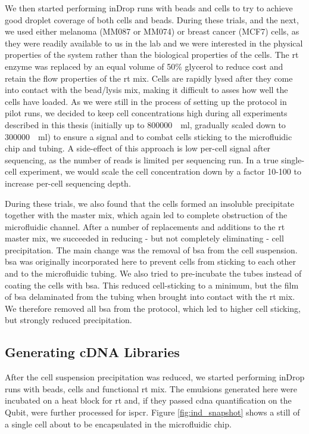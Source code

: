 We then started performing inDrop runs with beads and cells to try to achieve good droplet coverage of both cells and beads. During these trials, and the next, we used either melanoma (MM087 or MM074) or breast cancer (MCF7) cells, as they were readily available to us in the lab and we were interested in the physical properties of the system rather than the biological properties of the cells. The \acrshort{rt} enzyme was replaced by an equal volume of 50\% glycerol to reduce cost and retain the flow properties of the \acrshort{rt} mix. Cells are rapidly lysed after they come into contact with the bead/lysis mix, making it difficult to asses how well the cells have loaded. As we were still in the process of setting up the protocol in pilot runs, we decided to keep cell concentrations high during all experiments described in this thesis (initially up to \SI[per-mode=symbol]{800000}{\per\ml}, gradually scaled down to \SI[per-mode=symbol]{300000}{\per\ml}) to ensure a signal and to combat cells sticking to the microfluidic chip and tubing. A side-effect of this approach is low per-cell signal after sequencing, as the number of reads is limited per sequencing run. In a true single-cell experiment, we would scale the cell concentration down by a factor 10-100 to increase per-cell sequencing depth.\pms

During these trials, we also found that the cells formed an insoluble precipitate together with the master mix, which again led to complete obstruction of the microfluidic channel. After a number of replacements and additions to the \acrshort{rt} master mix, we succeeded in reducing - but not completely eliminating - cell precipitation. The main change was the removal of \acrshort{bsa} from the cell suspension. \acrshort{bsa} was originally incorporated here to prevent cells from sticking to each other and to the microfluidic tubing. We also tried to pre-incubate the tubes instead of coating the cells with \acrshort{bsa}. This reduced cell-sticking to a minimum, but the film of \acrshort{bsa} delaminated from the tubing when brought into contact with the \acrshort{rt} mix. We therefore removed all \acrshort{bsa} from the protocol, which led to higher cell sticking, but strongly reduced precipitation.\pms


\subsection{Generating cDNA Libraries}
After the cell suspension precipitation was reduced, we started performing inDrop runs with beads, cells and functional \acrshort{rt} mix. The emulsions generated here were incubated on a heat block for \acrlong{rt} and, if they passed \acrshort{cdna} quantification on the Qubit, were further processed for \acrshort{ispcr}. Figure \ref{fig:ind_snapshot} shows a still of a single cell about to be encapsulated in the microfluidic chip.\pms

